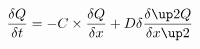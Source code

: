\begin{equation}
\frac{\delta Q}{\delta t} = -C \times \frac{\delta Q}{\delta x} + D \delta \frac{\delta \up2 Q}{\delta x\up2}
\end{equation}



